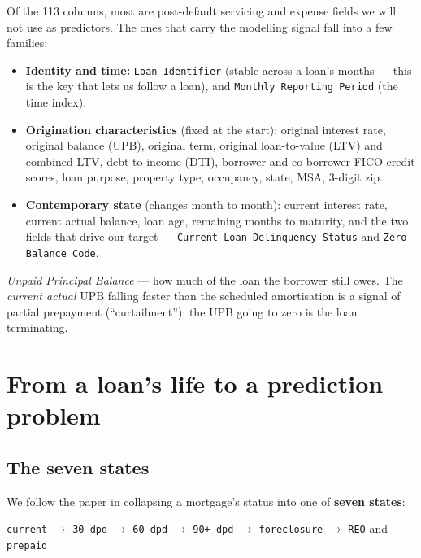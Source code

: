 \documentclass[11pt]{article}
\begin{document}
Of the 113 columns, most are post-default servicing and expense fields we will not use as
predictors. The ones that carry the modelling signal fall into a few families:

\begin{itemize}[leftmargin=1.4em, itemsep=2pt]
  \item \textbf{Identity and time:} \texttt{Loan Identifier} (stable across a loan's
        months --- this is the key that lets us follow a loan), and
        \texttt{Monthly Reporting Period} (the time index).
  \item \textbf{Origination characteristics} (fixed at the start): original interest rate,
        original balance (UPB), original term, original loan-to-value (LTV) and combined
        LTV, debt-to-income (DTI), borrower and co-borrower FICO credit scores, loan
        purpose, property type, occupancy, state, MSA, 3-digit zip.
  \item \textbf{Contemporary state} (changes month to month): current interest rate,
        current actual balance, loan age, remaining months to maturity, and the two fields
        that drive our target --- \texttt{Current Loan Delinquency Status} and
        \texttt{Zero Balance Code}.
\end{itemize}

\begin{jargon}[UPB]
\emph{Unpaid Principal Balance} --- how much of the loan the borrower still owes. The
\emph{current actual} UPB falling faster than the scheduled amortisation is a signal of
partial prepayment (``curtailment''); the UPB going to zero is the loan terminating.
\end{jargon}

\section{From a loan's life to a prediction problem}
\label{sec:states}

\subsection{The seven states}

We follow the paper in collapsing a mortgage's status into one of \textbf{seven states}:

\begin{center}
\texttt{current} $\to$ \texttt{30 dpd} $\to$ \texttt{60 dpd} $\to$ \texttt{90+ dpd}
$\to$ \texttt{foreclosure} $\to$ \texttt{REO} \quad and \quad \texttt{prepaid}
\end{center}
\end{document}
